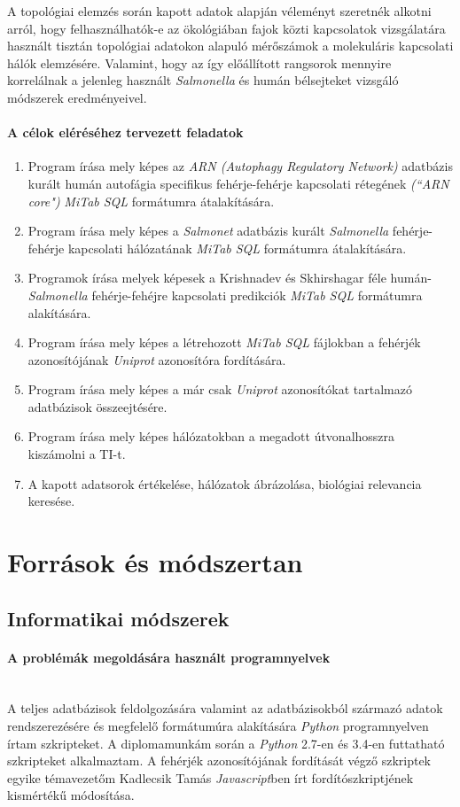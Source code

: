 \documentclass[a4paper,12pt]{article}
\begin{document}
	A topológiai elemzés során kapott adatok alapján véleményt szeretnék alkotni arról, hogy felhasználhatók-e az ökológiában fajok közti kapcsolatok vizsgálatára használt tisztán topológiai adatokon alapuló mérőszámok a molekuláris kapcsolati hálók elemzésére. Valamint, hogy az így előállított rangsorok mennyire korrelálnak a jelenleg használt \textit{Salmonella} és humán bélsejteket vizsgáló módszerek eredményeivel.

	\paragraph{A célok eléréséhez tervezett feladatok}
	\begin{enumerate}
		\item Program írása mely képes az \textit{ARN (Autophagy Regulatory Network)} adatbázis kurált humán autofágia specifikus fehérje-fehérje kapcsolati rétegének \textit{(``ARN core")} \textit{MiTab SQL} formátumra átalakítására.
		\item Program írása mely képes a \textit{Salmonet} adatbázis kurált \textit{Salmonella} fehérje-fehérje kapcsolati hálózatának \textit{MiTab SQL} formátumra átalakítására.
		\item Programok írása melyek képesek a Krishnadev és Skhirshagar féle humán-\textit{Salmonella} fehérje-fehéjre kapcsolati predikciók \textit{MiTab SQL} formátumra alakítására.
		\item Program írása mely képes a létrehozott \textit{MiTab SQL} fájlokban a fehérjék azonosítójának \textit{Uniprot} azonosítóra fordítására.
		\item Program írása mely képes a már csak \textit{Uniprot} azonosítókat tartalmazó adatbázisok összeejtésére.
		\item Program írása mely képes hálózatokban a megadott útvonalhosszra kiszámolni a TI-t.
		\item A kapott adatsorok értékelése, hálózatok ábrázolása, biológiai relevancia keresése.
	\end{enumerate}
	\pagebreak

\section{Források és módszertan}

	\subsection{Informatikai módszerek}
			\paragraph{A problémák megoldására használt programnyelvek} \mbox{}\\
			A teljes adatbázisok feldolgozására valamint az adatbázisokból származó adatok rendszerezésére és megfelelő formátumúra alakítására \textit{Python} programnyelven írtam szkripteket. A diplomamunkám során a \textit{Python} 2.7-en és 3.4-en futtatható szkripteket alkalmaztam. A fehérjék azonosítójának fordítását végző szkriptek egyike témavezetőm Kadlecsik Tamás \textit{Javascript}ben írt fordítószkriptjének kismértékű módosítása.
			
\end{document}
